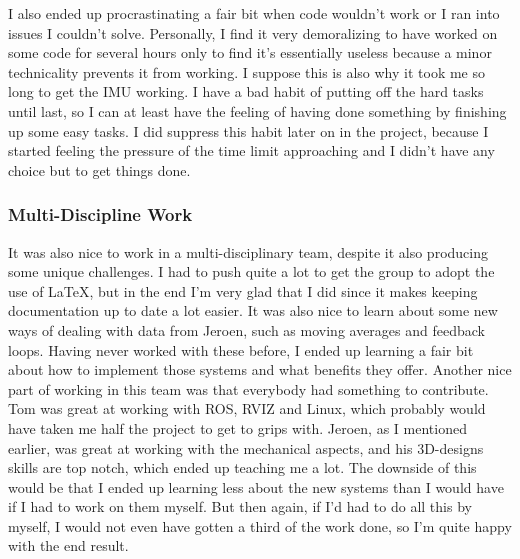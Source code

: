 I also ended up procrastinating a fair bit when code wouldn't work or I ran into issues I couldn't solve.
Personally, I find it very demoralizing to have worked on some code for several hours only to find it's essentially useless because a minor technicality prevents it from working.
I suppose this is also why it took me so long to get the IMU working.
I have a bad habit of putting off the hard tasks until last, so I can at least have the feeling of having done something by finishing up some easy tasks.
I did suppress this habit later on in the project, because I started feeling the pressure of the time limit approaching and I didn't have any choice but to get things done.

\subsubsection{Multi-Discipline Work}
It was also nice to work in a multi-disciplinary team, despite it also producing some unique challenges.
I had to push quite a lot to get the group to adopt the use of \LaTeX, but in the end I'm very glad that I did since it makes keeping documentation up to date a lot easier.
It was also nice to learn about some new ways of dealing with data from Jeroen, such as moving averages and feedback loops.
Having never worked with these before, I ended up learning a fair bit about how to implement those systems and what benefits they offer.
Another nice part of working in this team was that everybody had something to contribute.
Tom was great at working with ROS, RVIZ and Linux, which probably would have taken me half the project to get to grips with.
Jeroen, as I mentioned earlier, was great at working with the mechanical aspects, and his 3D-designs skills are top notch, which ended up teaching me a lot.
The downside of this would be that I ended up learning less about the new systems than I would have if I had to work on them myself.
But then again, if I'd had to do all this by myself, I would not even have gotten a third of the work done, so I'm quite happy with the end result.



\newpage

